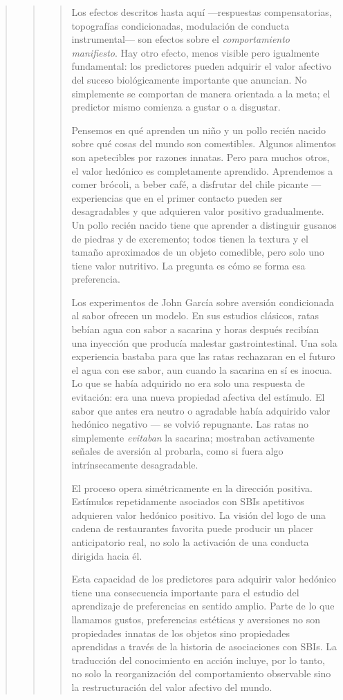 \documentclass[
  letterpaper,
  DIV=11,
  numbers=noendperiod]{scrreprt}
\begin{document}
\begin{tcolorbox}[enhanced jigsaw, toprule=.15mm, arc=.35mm, colback=white, opacityback=0, colframe=quarto-callout-note-color-frame, breakable, rightrule=.15mm, left=2mm, leftrule=.75mm, bottomrule=.15mm]
\begin{quote}
\begin{quote}
\begin{quote}
Los efectos descritos hasta aquí ---respuestas compensatorias,
topografías condicionadas, modulación de conducta instrumental--- son
efectos sobre el \emph{comportamiento manifiesto}. Hay otro efecto,
menos visible pero igualmente fundamental: los predictores pueden
adquirir el valor afectivo del suceso biológicamente importante que
anuncian. No simplemente se comportan de manera orientada a la meta; el
predictor mismo comienza a gustar o a disgustar.

Pensemos en qué aprenden un niño y un pollo recién nacido sobre qué
cosas del mundo son comestibles. Algunos alimentos son apetecibles por
razones innatas. Pero para muchos otros, el valor hedónico es
completamente aprendido. Aprendemos a comer brócoli, a beber café, a
disfrutar del chile picante --- experiencias que en el primer contacto
pueden ser desagradables y que adquieren valor positivo gradualmente. Un
pollo recién nacido tiene que aprender a distinguir gusanos de piedras y
de excremento; todos tienen la textura y el tamaño aproximados de un
objeto comedible, pero solo uno tiene valor nutritivo. La pregunta es
cómo se forma esa preferencia.

Los experimentos de John García sobre aversión condicionada al sabor
ofrecen un modelo. En sus estudios clásicos, ratas bebían agua con sabor
a sacarina y horas después recibían una inyección que producía malestar
gastrointestinal. Una sola experiencia bastaba para que las ratas
rechazaran en el futuro el agua con ese sabor, aun cuando la sacarina en
sí es inocua. Lo que se había adquirido no era solo una respuesta de
evitación: era una nueva propiedad afectiva del estímulo. El sabor que
antes era neutro o agradable había adquirido valor hedónico negativo ---
se volvió repugnante. Las ratas no simplemente \emph{evitaban} la
sacarina; mostraban activamente señales de aversión al probarla, como si
fuera algo intrínsecamente desagradable.

El proceso opera simétricamente en la dirección positiva. Estímulos
repetidamente asociados con SBIs apetitivos adquieren valor hedónico
positivo. La visión del logo de una cadena de restaurantes favorita
puede producir un placer anticipatorio real, no solo la activación de
una conducta dirigida hacia él.

Esta capacidad de los predictores para adquirir valor hedónico tiene una
consecuencia importante para el estudio del aprendizaje de preferencias
en sentido amplio. Parte de lo que llamamos gustos, preferencias
estéticas y aversiones no son propiedades innatas de los objetos sino
propiedades aprendidas a través de la historia de asociaciones con SBIs.
La traducción del conocimiento en acción incluye, por lo tanto, no solo
la reorganización del comportamiento observable sino la restructuración
del valor afectivo del mundo.


\end{quote}
\end{quote}
\end{quote}
\end{tcolorbox}
\end{document}
